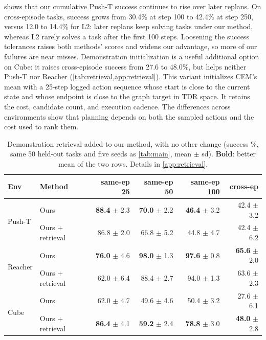 \documentclass{article} %
\theoremstyle{definition}
\theoremstyle{remark}
\begin{document}
 shows that our cumulative Push-T success continues to rise over
later replans. On cross-episode tasks, success grows from 30.4\% at step 100 to
42.4\% at step 250, versus 12.0 to 14.4\% for L2: later replans keep solving tasks under our
method, whereas L2 rarely solves a task after the first 100 steps.
Loosening the success tolerances raises both methods' scores and widens our advantage,
so more of our failures are near misses.
Demonstration initialization is a useful additional option on Cube: it raises
cross-episode success from 27.6 to 48.0\%, but helps neither Push-T nor Reacher
(\cref{tab:retrieval,app:retrieval}).
This variant initializes CEM's mean with a 25-step logged action sequence whose
start is close to the current state and whose endpoint is close to the graph target
in TDR space. It retains the cost, candidate count, and execution cadence.
The differences across environments show that planning depends on both the sampled
actions and the cost used to rank them.

\begin{table}[t]
\centering\small
\caption{Demonstration retrieval added to our method, with no other change (success \%, same
50 held-out tasks and five seeds as \cref{tab:main}, mean $\pm$ sd). \textbf{Bold}: better
mean of the two rows. Details in \cref{app:retrieval}.}
\label{tab:retrieval}
\begin{tabular}{llrrrr}
\toprule
Env & Method & same-ep 25 & same-ep 50 & same-ep 100 & cross-ep \\
\midrule
\multirow{2}{*}{Push-T} & Ours & \textbf{88.4} $\pm$ 2.3 & \textbf{70.0} $\pm$ 2.2 & \textbf{46.4} $\pm$ 3.2 & 42.4 $\pm$ 3.2 \\
 & Ours + retrieval & 86.8 $\pm$ 2.0 & 66.8 $\pm$ 5.2 & 44.8 $\pm$ 4.7 & 42.4 $\pm$ 6.2 \\
\midrule
\multirow{2}{*}{Reacher} & Ours & \textbf{76.0} $\pm$ 4.6 & \textbf{98.0} $\pm$ 1.3 & \textbf{97.6} $\pm$ 0.8 & \textbf{65.6} $\pm$ 2.0 \\
 & Ours + retrieval & 62.0 $\pm$ 6.4 & 88.4 $\pm$ 2.7 & 94.0 $\pm$ 1.3 & 63.6 $\pm$ 2.3 \\
\midrule
\multirow{2}{*}{Cube} & Ours & 62.0 $\pm$ 4.7 & 49.6 $\pm$ 4.6 & 50.4 $\pm$ 3.2 & 27.6 $\pm$ 6.1 \\
 & Ours + retrieval & \textbf{86.4} $\pm$ 4.1 & \textbf{59.2} $\pm$ 2.4 & \textbf{78.8} $\pm$ 3.0 & \textbf{48.0} $\pm$ 2.8 \\
\bottomrule
\end{tabular}
\end{table}
\end{document}
